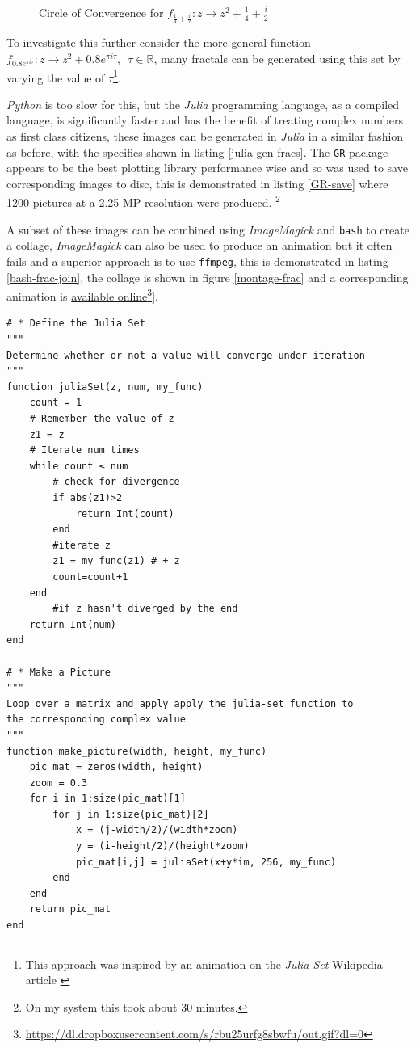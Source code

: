 \documentclass[11pt]{article}
\begin{document}
\begin{figure}[htbp]
\centering

\caption{\label{py-jl-rab-plot}Circle of Convergence for \(f_{\frac{1}{4} + \frac{i}{2}}: z \rightarrow z^{2} + \frac{1}{4} + \frac{i}{2}\)}
\end{figure}

To investigate this further consider the
more general function \(f_{0.8 e^{\pi i \tau}}: z \rightarrow z^{2} + 0.8 e^{\pi
i \tau}, \enspace \tau \in \mathbb{R}\), many fractals can be generated using
this set by varying the value of \(\tau\)\footnote{This approach was inspired by an animation on the \emph{Julia Set} Wikipedia article \cite{JuliaSet2020}}.

\emph{Python} is too slow for this, but the \emph{Julia} programming language, as a
compiled language, is significantly faster and has the benefit of treating
complex numbers as first class citizens, these images can be generated in
\emph{Julia} in a similar fashion as before, with the specifics shown in listing
\ref{julia-gen-fracs}. The \texttt{GR} package appears to be the best plotting library
performance wise and so was used to save corresponding images to disc, this is
demonstrated in listing \ref{GR-save} where 1200 pictures at a 2.25 MP resolution were produced. \footnote{On my system this took about 30 minutes.}

A subset of these images can be combined using \emph{ImageMagick} and \texttt{bash} to
create a collage, \emph{ImageMagick} can also be used to produce an animation but it often
fails and a superior approach is to use \texttt{ffmpeg}, this is demonstrated in
listing \ref{bash-frac-join}, the collage is shown in figure \ref{montage-frac} and a corresponding
animation is \href{https://dl.dropboxusercontent.com/s/rbu25urfg8sbwfu/out.gif?dl=0}{available online}\footnote{\href{https://dl.dropboxusercontent.com/s/rbu25urfg8sbwfu/out.gif?dl=0}{https://dl.dropboxusercontent.com/s/rbu25urfg8sbwfu/out.gif?dl=0}}].

\begin{lstlisting}
# * Define the Julia Set
"""
Determine whether or not a value will converge under iteration
"""
function juliaSet(z, num, my_func)
    count = 1
    # Remember the value of z
    z1 = z
    # Iterate num times
    while count ≤ num
        # check for divergence
        if abs(z1)>2
            return Int(count)
        end
        #iterate z
        z1 = my_func(z1) # + z
        count=count+1
    end
        #if z hasn't diverged by the end
    return Int(num)
end

# * Make a Picture
"""
Loop over a matrix and apply apply the julia-set function to
the corresponding complex value
"""
function make_picture(width, height, my_func)
    pic_mat = zeros(width, height)
    zoom = 0.3
    for i in 1:size(pic_mat)[1]
        for j in 1:size(pic_mat)[2]
            x = (j-width/2)/(width*zoom)
            y = (i-height/2)/(height*zoom)
            pic_mat[i,j] = juliaSet(x+y*im, 256, my_func)
        end
    end
    return pic_mat
end

\end{lstlisting}
\end{document}

